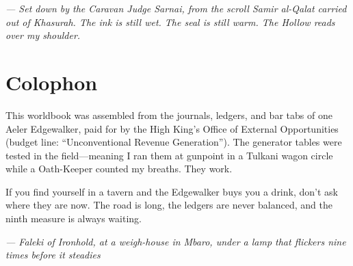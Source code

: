 \documentclass[11pt,letterpaper,twoside]{book}
\begin{document}
\vspace{1em}
\begin{flushright}
\textit{--- Set down by the Caravan Judge Sarnai, from the scroll Samir al-Qalat carried out of Khasurah. The ink is still wet. The seal is still warm. The Hollow reads over my shoulder.}
\end{flushright}

\chapter*{Colophon}
\label{chap:colophon}

This worldbook was assembled from the journals, ledgers, and bar tabs of one Aeler Edgewalker, paid for by the High King's Office of External Opportunities (budget line: ``Unconventional Revenue Generation''). The generator tables were tested in the field---meaning I ran them at gunpoint in a Tulkani wagon circle while a Oath-Keeper counted my breaths. They work.

If you find yourself in a tavern and the Edgewalker buys you a drink, don't ask where they are now. The road is long, the ledgers are never balanced, and the ninth measure is always waiting.

\vspace{1em}
\noindent\textit{--- Faleki of Ironhold, at a weigh-house in Mbaro, under a lamp that flickers nine times before it steadies}
\end{document}
